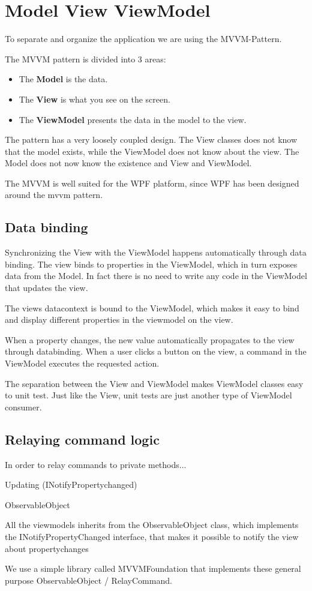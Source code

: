 \section{Model View ViewModel}
To separate and organize the application we are using the MVVM-Pattern.

The MVVM pattern is divided into 3 areas:

\begin{itemize}
	\item The \textbf{Model} is the data.
	\item The \textbf{View} is what you see on the screen.
	\item The \textbf{ViewModel} presents the data in the model to the view.
\end{itemize}

The pattern has a very loosely coupled design.
The View classes does not know that the model exists, while the ViewModel does not know about the view. The Model does not now know the existence and View and ViewModel.

The MVVM is well suited for the WPF platform, since WPF has been designed around the mvvm pattern.

\subsection{Data binding}
Synchronizing the View with the ViewModel happens automatically through data binding.
The view binds to properties in the ViewModel, which in turn exposes data from the Model. In fact there is no need to write any code in the ViewModel that updates the view.

The views datacontext is bound to the ViewModel, which makes it easy to bind and display different properties in the viewmodel on the view.

When a property changes, the new value automatically propagates to the view through databinding.
When a user clicks a button on the view, a command in the ViewModel executes the requested action.

The separation between the View and ViewModel makes ViewModel classes easy to unit test. Just like the View, unit tests are just another type of ViewModel consumer.


\subsection{Relaying command logic}
In order to relay commands to private methods...

Updating (INotifyPropertychanged)

ObservableObject 

All the viewmodels inherits from the ObservableObject class, which implements the INotifyPropertyChanged interface, that makes it possible to notify the view about propertychanges

We use a simple library called MVVMFoundation that implements these general purpose ObservableObject / RelayCommand.


